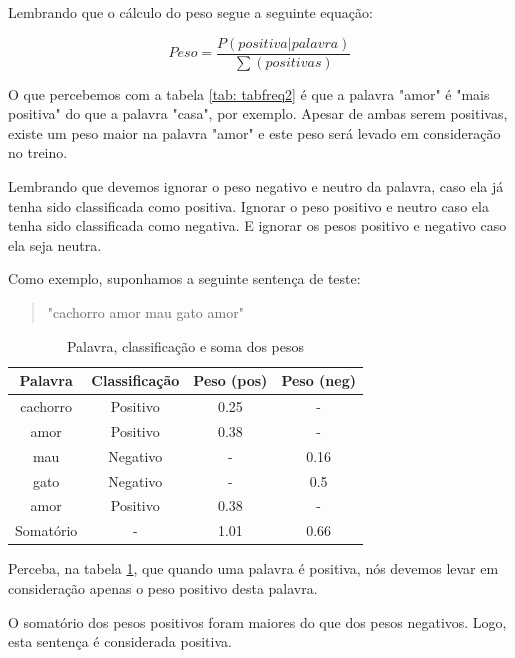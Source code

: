 \documentclass[
article,			%
12pt,				%
a4paper,			%
english,			%
brazil,				%
sumario=tradicional,
twoside
]{abntex2}
\begin{document}
    Lembrando que o cálculo do peso segue a seguinte equação:
	
	\begin{equation}
	Peso = \frac{P(positiva|palavra)}{\sum(positivas)}
	\end{equation}
	
	O que percebemos com a tabela \ref{tab: tabfreq2} é que a palavra "amor"  é "mais positiva"  do que a palavra "casa", por exemplo. Apesar de ambas serem positivas, existe um peso maior na palavra "amor" e este peso será levado em consideração no treino.

	Lembrando que devemos ignorar o peso negativo e neutro da palavra, caso ela já tenha sido classificada como positiva. Ignorar o peso positivo e neutro caso ela tenha sido classificada como negativa. E ignorar os pesos positivo e negativo caso ela seja neutra.
	 
	Como exemplo, suponhamos a seguinte sentença de teste:
	\begin{quote}
		"cachorro amor mau gato amor"
	\end{quote}
    
    
	\begin{table}[!h]
		\caption{Palavra, classificação e soma dos pesos}
		\label{tab: tabfreq3}
		\centering
		
		\begin{tabular}{|c|c|c|c|} \hline
			\textbf{Palavra} & \textbf{Classificação} & \textbf{Peso (pos)} & \textbf{Peso (neg)}\\
			\hline
			cachorro & Positivo & 0.25 & -\\
			amor & Positivo & 0.38 & - \\
			mau & Negativo & - & 0.16\\
			gato & Negativo & - & 0.5\\
			amor & Positivo & 0.38 & -\\
			\hline
			Somatório & - & 1.01 & 0.66 \\
			\hline
			
		\end{tabular}
		
	\end{table}	
	
	Perceba, na tabela \ref{tab: tabfreq3}, que quando uma palavra é positiva, nós devemos levar em consideração apenas o peso positivo desta palavra. 
	
	O somatório dos pesos positivos foram maiores do que dos pesos negativos. 
	Logo, esta sentença é considerada positiva.
	
\end{document}
